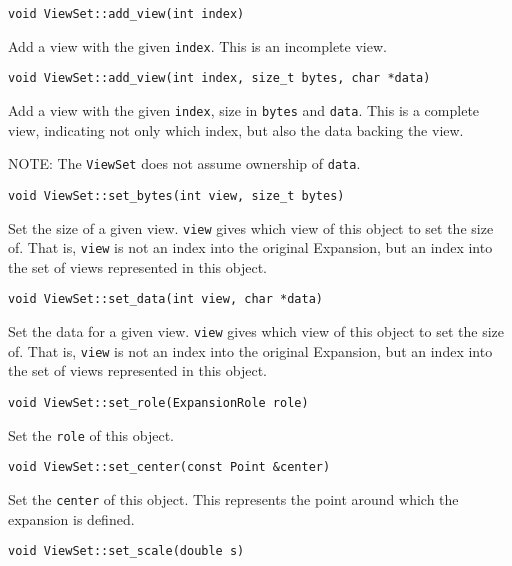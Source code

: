 \begin{lstlisting}
void ViewSet::add_view(int index)
\end{lstlisting}

\noindent Add a view with the given \texttt{index}. This is an incomplete view.

\begin{lstlisting}
void ViewSet::add_view(int index, size_t bytes, char *data)
\end{lstlisting}

\noindent Add a view with the given \texttt{index}, size in \texttt{bytes} and
\texttt{data}. This is a complete view, indicating not only which index, but
also the data backing the view.

NOTE: The \texttt{ViewSet} does not assume ownership of \texttt{data}.

\begin{lstlisting}
void ViewSet::set_bytes(int view, size_t bytes)
\end{lstlisting}

\noindent Set the size of a given view. \texttt{view} gives which view of this
object to set the size of. That is, \texttt{view} is not an index into the
original Expansion, but an index into the set of views represented in this
object.

\begin{lstlisting}
void ViewSet::set_data(int view, char *data)
\end{lstlisting}

\noindent Set the data for a given view. \texttt{view} gives which view of this
object to set the size of. That is, \texttt{view} is not an index into the
original Expansion, but an index into the set of views represented in this
object.

\begin{lstlisting}
void ViewSet::set_role(ExpansionRole role)
\end{lstlisting}

\noindent Set the \texttt{role} of this object.

\begin{lstlisting}
void ViewSet::set_center(const Point &center)
\end{lstlisting}

\noindent Set the \texttt{center} of this object. This represents the point
around which the expansion is defined.

\begin{lstlisting}
void ViewSet::set_scale(double s)
\end{lstlisting}

